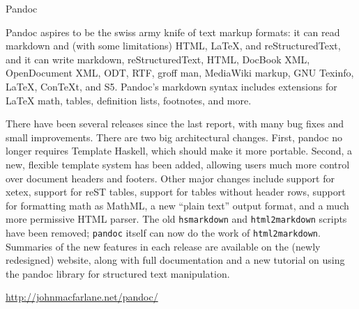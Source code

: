 \begin{hcarentry}[updated]{Pandoc}
\label{pandoc}
\makeheader

Pandoc aspires to be the swiss army knife of text markup formats: it
can read markdown and (with some limitations) HTML, LaTeX, and
reStructuredText, and it can write markdown, reStructuredText, HTML,
DocBook XML, OpenDocument XML, ODT, RTF, groff man, MediaWiki markup,
GNU Texinfo, LaTeX, ConTeXt, and S5.  Pandoc's markdown syntax includes
extensions for LaTeX math, tables, definition lists, footnotes, and more.

There have been several releases since the last report, with many
bug fixes and small improvements. There are two big architectural
changes. First, pandoc no longer requires Template Haskell, which should
make it more portable. Second, a new, flexible template system has been
added, allowing users much more control over document headers and footers.
Other major changes include support for xetex, support for reST tables,
support for tables without header rows, support for formatting
math as MathML, a new ``plain text'' output format, and a much
more permissive HTML parser. The old \verb!hsmarkdown! and
\verb!html2markdown! scripts have been removed; \verb!pandoc! itself can
now do the work of \verb!html2markdown!. Summaries of the new features
in each release are available on the (newly redesigned) website, along
with full documentation and a new tutorial on using the pandoc
library for structured text manipulation.

\FurtherReading
    \url{http://johnmacfarlane.net/pandoc/}
\end{hcarentry}
